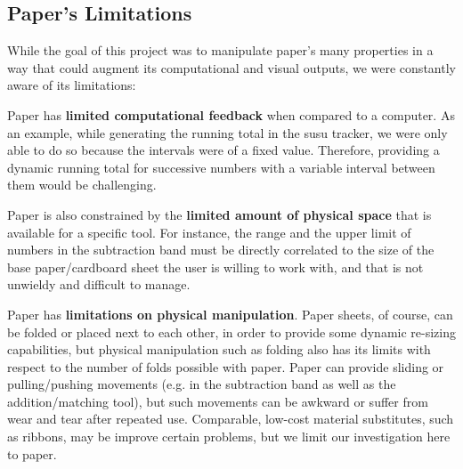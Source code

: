\documentclass{sig-alternate}
\begin{document}


\subsection {Paper's Limitations}

While the goal of this project was to manipulate paper's many properties in a way that could augment its computational and visual outputs, we were constantly aware of its limitations:
\begin{compactitem}
  \item Paper has {\bf limited computational feedback} when compared to a computer. As an example, while generating the running total in the susu tracker, we were only able to do so because the intervals were of a fixed value. Therefore, providing a dynamic running total for successive numbers with a variable interval between them would be challenging. 
  \item Paper is also constrained by the {\bf limited amount of physical space} that is available for a specific tool. For instance, the range and the upper limit of numbers in the subtraction band must be directly correlated to the size of the base paper/cardboard sheet the user is willing to work with, and that is not unwieldy and difficult to manage.
  \item Paper has {\bf limitations on physical manipulation}. Paper sheets, of course, can be folded or placed next to each other, in order to provide some dynamic re-sizing capabilities, but physical manipulation such as folding also has its limits with respect to the number of folds possible with paper. Paper can provide sliding or pulling/pushing movements (e.g. in the subtraction band as well as the addition/matching tool), but such movements can be awkward or suffer from wear and tear after repeated use. Comparable, low-cost material substitutes, such as ribbons, may be improve certain problems, but we limit our investigation here to paper.
\end{compactitem}
\end{document}
